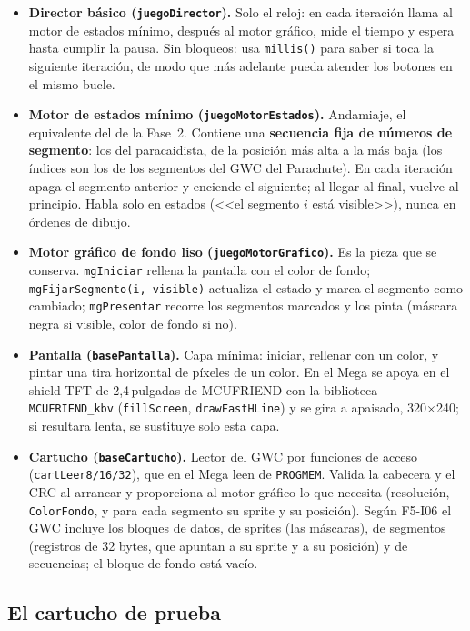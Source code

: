 \begin{itemize}
	\item \textbf{Director básico (\texttt{juegoDirector}).} Solo el reloj: en cada iteración llama al motor de estados mínimo, después al motor gráfico, mide el tiempo y espera hasta cumplir la pausa. Sin bloqueos: usa \texttt{millis()} para saber si toca la siguiente iteración, de modo que más adelante pueda atender los botones en el mismo bucle.
	\item \textbf{Motor de estados mínimo (\texttt{juegoMotorEstados}).} Andamiaje, el equivalente del de la Fase~2. Contiene una \textbf{secuencia fija de números de segmento}: los del paracaidista, de la posición más alta a la más baja (los índices son los de los segmentos del GWC del Parachute). En cada iteración apaga el segmento anterior y enciende el siguiente; al llegar al final, vuelve al principio. Habla solo en estados (<<el segmento $i$ está visible>>), nunca en órdenes de dibujo.
	\item \textbf{Motor gráfico de fondo liso (\texttt{juegoMotorGrafico}).} Es la pieza que se conserva. \texttt{mgIniciar} rellena la pantalla con el color de fondo; \texttt{mgFijarSegmento(i, visible)} actualiza el estado y marca el segmento como cambiado; \texttt{mgPresentar} recorre los segmentos marcados y los pinta (máscara negra si visible, color de fondo si no).
	\item \textbf{Pantalla (\texttt{basePantalla}).} Capa mínima: iniciar, rellenar con un color, y pintar una tira horizontal de píxeles de un color. En el Mega se apoya en el shield TFT de 2,4\,pulgadas de MCUFRIEND con la biblioteca \texttt{MCUFRIEND\_kbv} (\texttt{fillScreen}, \texttt{drawFastHLine}) y se gira a apaisado, 320$\times$240; si resultara lenta, se sustituye solo esta capa.
	\item \textbf{Cartucho (\texttt{baseCartucho}).} Lector del GWC por funciones de acceso (\texttt{cartLeer8/16/32}), que en el Mega leen de \texttt{PROGMEM}. Valida la cabecera y el CRC al arrancar y proporciona al motor gráfico lo que necesita (resolución, \texttt{ColorFondo}, y para cada segmento su sprite y su posición). Según F5-I06 el GWC incluye los bloques de datos, de sprites (las máscaras), de segmentos (registros de 32 bytes, que apuntan a su sprite y a su posición) y de secuencias; el bloque de fondo está vacío.
\end{itemize}

\subsection{El cartucho de prueba}
\label{sec:F6I02Cartucho}


